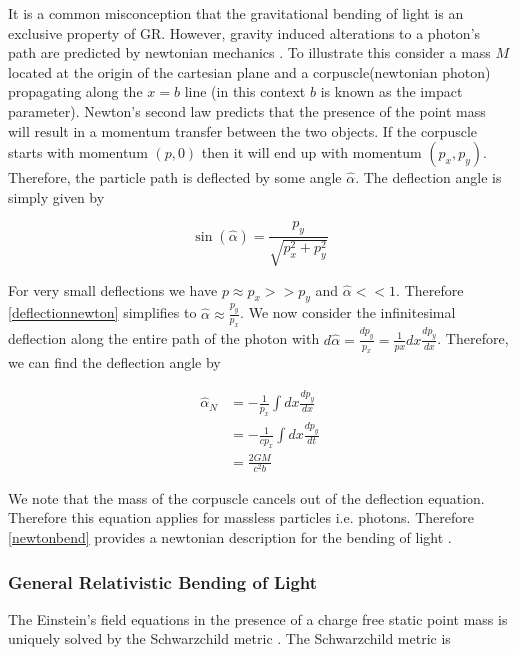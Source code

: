 It is a common misconception that the gravitational bending of light is an exclusive property of GR.
However, gravity induced alterations to a photon's path are predicted by newtonian mechanics \cite{lensingbook}. To illustrate this 
consider a mass $M$ located at the origin of the cartesian plane and a corpuscle(newtonian photon) 
propagating along the $x=b$ line (in this context $b$ is known as the impact parameter). 
Newton's second law predicts that the presence of the point mass will result in a momentum transfer
between the two objects. If the corpuscle starts with 
momentum $(p,0)$ then it will end up with momentum $(p_x,p_y)$.
Therefore, the particle path is deflected by some angle $\hat{\alpha}$. The deflection angle is 
simply given by 

\begin{equation}
  \sin(\hat{\alpha}) = \frac{p_y}{\sqrt{p_x^2+p_y^2}}
  \label{deflectionnewton}
\end{equation}


\par For very small deflections we have $p\approx p_x >> p_y$ and $\hat{\alpha} << 1$. 
Therefore \autoref{deflectionnewton} simplifies to $\hat{\alpha}
\approx \frac{p_y}{p_x}$. We now consider the infinitesimal deflection along the entire path of the photon with
$d\hat{\alpha} = \frac{dp_y}{p_x} = \frac{1}{px} dx \frac{dp_y}{dx}$. Therefore, we can find the deflection
angle by 

\begin{equation}
  \begin{split}
  \hat{\alpha}_N &= -\frac{1}{p_x} \int dx \frac{dp_y}{dx} \\
  &= -\frac{1}{cp_x} \int dx \frac{dp_y}{dt}  \\ 
  &= \frac{2GM}{c^2b}
  \end{split}  
  \label{newtonbend}
\end{equation}

We note that the mass of the corpuscle cancels out of the deflection equation. Therefore this equation applies
for massless particles i.e. photons. Therefore \autoref{newtonbend} provides a newtonian description for the 
bending of light \cite{lensingbook}.

\subsubsection{General Relativistic Bending of Light}
The Einstein's field equations in the presence of a charge free static point mass is uniquely solved by 
the Schwarzchild metric \cite{GR1}. The Schwarzchild metric is

